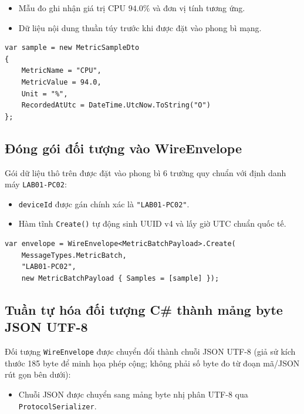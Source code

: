 \documentclass[12pt,a4paper]{article}
\begin{document}
\begin{orientationbox}
\begin{itemize}[leftmargin=1.5em, itemsep=1pt]
  \item Mẫu đo ghi nhận giá trị CPU $94.0\%$ và đơn vị tính tương ứng.
  \item Dữ liệu nội dung thuần túy trước khi được đặt vào phong bì mạng.
\end{itemize}
\end{orientationbox}

\begin{lstlisting}[language=CSharp]
var sample = new MetricSampleDto
{
    MetricName = "CPU",
    MetricValue = 94.0,
    Unit = "%",
    RecordedAtUtc = DateTime.UtcNow.ToString("O")
};
\end{lstlisting}

\subsection{Đóng gói đối tượng vào WireEnvelope}
Gói dữ liệu thô trên được đặt vào phong bì 6 trường quy chuẩn với định danh máy \texttt{LAB01-PC02}:

\begin{orientationbox}
\begin{itemize}[leftmargin=1.5em, itemsep=1pt]
  \item \texttt{deviceId} được gán chính xác là \texttt{"LAB01-PC02"}.
  \item Hàm tĩnh \texttt{Create()} tự động sinh UUID v4 và lấy giờ UTC chuẩn quốc tế.
\end{itemize}
\end{orientationbox}

\begin{lstlisting}[language=CSharp]
var envelope = WireEnvelope<MetricBatchPayload>.Create(
    MessageTypes.MetricBatch,
    "LAB01-PC02",
    new MetricBatchPayload { Samples = [sample] });
\end{lstlisting}

\subsection{Tuần tự hóa đối tượng C\# thành mảng byte JSON UTF-8}
Đối tượng \texttt{WireEnvelope} được chuyển đổi thành chuỗi JSON UTF-8 (giả sử kích thước 185 byte để minh họa phép cộng; không phải số byte đo từ đoạn mã/JSON rút gọn bên dưới):

\begin{orientationbox}
\begin{itemize}[leftmargin=1.5em, itemsep=1pt]
  \item Chuỗi JSON được chuyển sang mảng byte nhị phân UTF-8 qua \texttt{ProtocolSerializer}.
\end{itemize}
\end{orientationbox}
\end{document}
